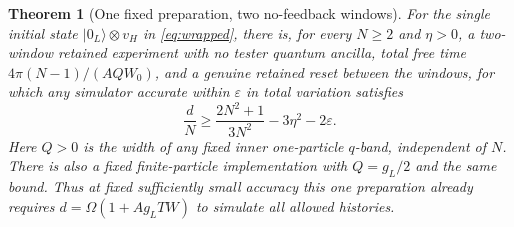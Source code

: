 \documentclass[11pt]{article}
\newtheorem{theorem}{Theorem}
\theoremstyle{remark}
\newcommand{\ket}[1]{\lvert #1\rangle}
\begin{document}
\begin{theorem}[One fixed preparation, two no-feedback windows]\label{thm:fixed}
For the single initial state \(\ket{0_L}\otimes v_H\) in
\eqref{eq:wrapped}, there is, for every \(N\ge2\) and \(\eta>0\),
a two-window retained experiment with no tester quantum ancilla,
total free time \(4\pi(N-1)/(AQW_0)\), and a genuine retained
reset between the windows, for which any simulator
accurate within \(\varepsilon\) in total variation satisfies
\begin{equation}\label{eq:fixed}
 \frac dN\ge \frac{2N^2+1}{3N^2}-3\eta^2-2\varepsilon .
\end{equation}
Here \(Q>0\) is the width of any fixed inner one-particle
\(q\)-band, independent of \(N\).
There is also a fixed finite-particle implementation with
\(Q=g_L/2\) and the same bound. Thus at fixed sufficiently small
accuracy this one preparation already requires
\(d=\Omega(1+A g_LTW)\) to simulate all allowed histories.
\end{theorem}
\end{document}
